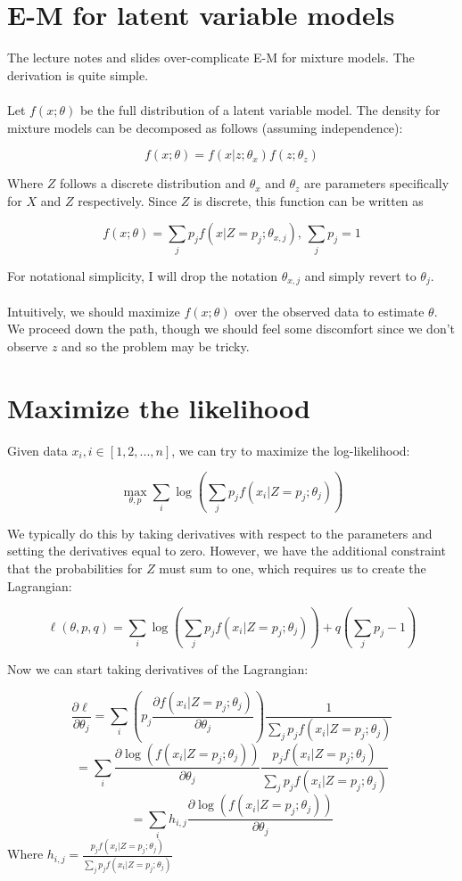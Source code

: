 \documentclass{article}
\begin{document}
\section{E-M for latent variable models}

The lecture notes and slides over-complicate E-M for mixture models.  The derivation is quite simple.
\\
\\

Let \(f(x; \theta)\) be the full distribution of a latent variable model.  The density for mixture models can be decomposed as follows (assuming independence):

\[f(x; \theta)=f(x|z; \theta_x)f(z; \theta_z )\] 

Where \(Z\) follows a discrete distribution and \(\theta_x\) and \(\theta_z\) are parameters specifically for \(X\) and \(Z\) respectively.  Since \(Z\) is discrete, this function can be written as 

\[f(x; \theta)=\sum_j p_j f(x|Z=p_j; \theta_{x, j}),\,\sum_j p_j =1\]

For notational simplicity, I will drop the notation \(\theta_{x, j}\) and simply revert to \(\theta_j\).
\\
\\
Intuitively, we should maximize \(f(x; \theta)\) over the observed data to estimate \(\theta\).  We proceed down the path, though we should feel some discomfort since we don't observe \(z\) and so the problem may be tricky.

\section{Maximize the likelihood}

Given data \(x_i, i\in [1, 2, ..., n]\), we can try to maximize the log-likelihood:

\[\max_{\theta, p} \sum_i \log\left(\sum_j p_j f(x_i|Z=p_j; \theta_j)\right)\]
 
We typically do this by taking derivatives with respect to the parameters and setting the derivatives equal to zero.  However, we have the additional constraint that the probabilities for \(Z\) must sum to one, which requires us to create the Lagrangian:

\[\ell(\theta, p, q)=\sum_i \log\left(\sum_j p_j f(x_i|Z=p_j; \theta_j)\right)+q\left(\sum_j p_j-1\right)\]

Now we can start taking derivatives of the Lagrangian:

\[\frac{\partial \ell}{\partial \theta_j}=\sum_i \left(p_j \frac{\partial f(x_i|Z=p_j; \theta_j)}{\partial \theta_j} \right) \frac{1}{\sum_j p_j f(x_i|Z=p_j; \theta_j)} \]
\[=\sum_i \frac{\partial \log\left(f(x_i|Z=p_j; \theta_j)\right)}{\partial \theta_j} \frac{p_jf(x_i|Z=p_j; \theta_j)} {\sum_j p_j f(x_i|Z=p_j; \theta_j)}\]
\[=\sum_i h_{i,j} \frac{\partial \log\left(f(x_i|Z=p_j; \theta_j)\right)}{\partial \theta_j}\]
Where \(h_{i,j}=\frac{p_jf(x_i|Z=p_j; \theta_j)} {\sum_j p_j f(x_i|Z=p_j; \theta_j)}\)
\end{document}
